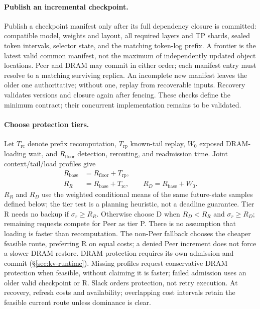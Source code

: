 \paragraph{Publish an incremental checkpoint.}
Publish a checkpoint manifest only after its full dependency closure is
committed: compatible model, weights and layout, all required layers and TP
shards, sealed token intervals, selector state, and the matching token-log
prefix. A frontier is the latest valid common manifest, not the maximum
of independently updated object locations. Peer and DRAM may commit in
either order; each manifest entry must resolve to a matching surviving
replica. An incomplete new manifest leaves the older one authoritative;
without one, replay from recoverable inputs. Recovery validates versions
and closure again after fencing. These checks define the minimum contract;
their concurrent implementation remains to be validated.

\paragraph{Choose protection tiers.}
Let $T_{\mathrm{rc}}$ denote prefix recomputation, $T_{\mathrm{rp}}$ known-tail
replay, $W_0$ exposed DRAM-loading wait, and $R_{\mathrm{floor}}$ detection,
rerouting, and readmission time. Joint context/tail/load profiles give
\begin{equation}
\begin{aligned}
 R_{\mathrm{base}}&=R_{\mathrm{floor}}+T_{\mathrm{rp}},\\
 R_R&=R_{\mathrm{base}}+T_{\mathrm{rc}},\qquad
 R_D=R_{\mathrm{base}}+W_0.
\end{aligned}
\label{eq:recovery-base}
\end{equation}
$R_R$ and $R_D$ use the weighted conditional means of the same
future-state samples defined below; the tier test is a planning heuristic,
not a deadline guarantee. Tier R needs no backup if $\sigma_r\ge R_R$.
Otherwise choose D when $R_D<R_R$ and $\sigma_r\ge R_D$; remaining
requests compete for Peer as tier P. There is no assumption that loading
is faster than recomputation. The non-Peer fallback chooses the cheaper
feasible route, preferring R on equal costs; a denied Peer increment does
not force a slower DRAM restore. DRAM protection requires its own admission
and commit (\S\ref{sec:kv-runtime}). Missing profiles request conservative
DRAM protection when feasible, without claiming it is faster; failed
admission uses an older valid checkpoint or R. Slack orders protection,
not retry execution. At recovery, refresh costs and availability; overlapping
cost intervals retain the feasible current route unless dominance is clear.

